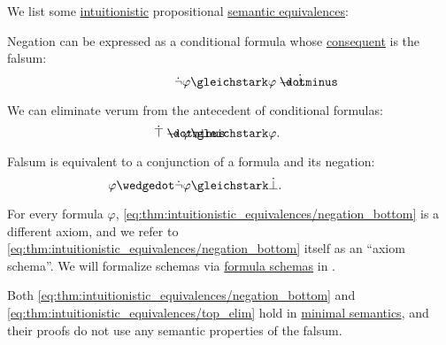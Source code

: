 \begin{proposition}\label{thm:intuitionistic_equivalences}
  We list some \hyperref[def:propositional_semantics/intuitionistic]{intuitionistic} propositional \hyperref[def:semantic_equivalence]{semantic equivalences}:
  \begin{thmenum}
     Negation can be expressed as a conditional formula whose \hyperref[def:conditional_formula/consequent]{consequent} is the falsum:
    \begin{equation}\label{eq:thm:intuitionistic_equivalences/negation_bottom}
      \mathllap{\synneg \varphi} \gleichstark \mathrlap{\varphi \synimplies \synbot.}
    \end{equation}

     We can eliminate verum from the antecedent of conditional formulas:
    \begin{equation}\label{eq:thm:intuitionistic_equivalences/top_elim}
      \mathllap{\syntop \synimplies \varphi} \gleichstark \mathrlap{\varphi.}
    \end{equation}

     Falsum is equivalent to a conjunction of a formula and its negation:
    \begin{equation}\label{eq:thm:intuitionistic_equivalences/contradiction}
      \mathllap{\varphi \synwedge \synneg \varphi} \gleichstark \mathrlap{\synbot.}
    \end{equation}
  \end{thmenum}
\end{proposition}
\begin{comments}
  \item For every formula \( \varphi \), \eqref{eq:thm:intuitionistic_equivalences/negation_bottom} is a different axiom, and we refer to \eqref{eq:thm:intuitionistic_equivalences/negation_bottom} itself as an \enquote{axiom schema}. We will formalize schemas via \hyperref[def:propositional_formula_schema]{formula schemas} in .
  \item Both \eqref{eq:thm:intuitionistic_equivalences/negation_bottom} and \eqref{eq:thm:intuitionistic_equivalences/top_elim} hold in \hyperref[def:minimal_propositional_semantics]{minimal semantics}, and their proofs do not use any semantic properties of the falsum.
\end{comments}
